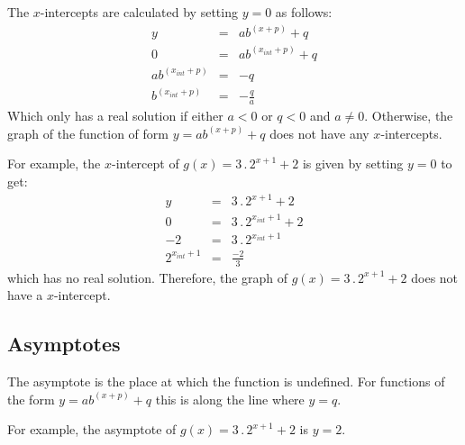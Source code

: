 The $x$-intercepts are calculated by setting $y=0$ as follows:
\begin{eqnarray}
y&=&ab^{(x+p)} + q\\
0&=&ab^{(x_{int}+p)} + q\\
ab^{(x_{int}+p)}&=&-q\\
b^{(x_{int}+p)}&=&-\frac{q}{a}
\end{eqnarray}
Which only has a real solution if either $a<0$ or $q<0$ and $a\neq0$. Otherwise, the graph of the function of form $y=ab^{(x+p)} + q$ does not have any $x$-intercepts.

For example, the $x$-intercept of $g(x)=3\,.\, 2^{x+1} + 2$ is given by setting $y=0$ to get:
\begin{eqnarray*}
y&=&3\,.\, 2^{x+1} + 2\\
0&=&3\,.\, 2^{x_{int}+1} + 2\\
-2&=&3\,.\, 2^{x_{int}+1}\\
2^{x_{int}+1}&=&\frac{-2}{3}
\end{eqnarray*}
which has no real solution. Therefore, the graph of $g(x)=3\,.\, 2^{x+1} + 2$ does not have a $x$-intercept.


\subsection{Asymptotes}
The asymptote is the place at which the function is undefined.  For functions of the form $y=ab^{(x+p)} + q$ this is along the line where $y = q$.

For example, the asymptote of $g(x)=3\,.\, 2^{x+1} + 2$ is $y = 2$.

